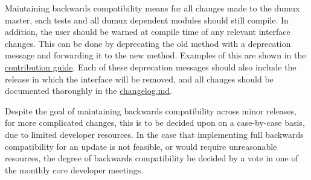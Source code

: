 Maintaining backwards compatibility means for all changes made to the dumux master, each tests and all dumux dependent modules should still compile. In addition, the user should be warned at compile time of any relevant interface changes. This can be done by deprecating the old method with a deprecation message and forwarding it to the new method. Examples of this are shown in the \href{https://git.iws.uni-stuttgart.de/dumux-repositories/dumux/blob/master/CONTRIBUTING.md}{contribution guide}. Each of these deprecation messages should also include the release in which the interface will be removed, and all changes should be documented thoroughly in the \href{https://git.iws.uni-stuttgart.de/dumux-repositories/dumux/-/blob/master/CHANGELOG.md}{changelog.md}.

Despite the goal of maintaining backwards compatibility across minor releases,
for more complicated changes, this is to be decided upon on a case-by-case basis, due to limited developer resources.
In the case that implementing full backwards compatibility for an update is not feasible, or would require unreasonable resources, the degree of backwards compatibility be decided by a vote in one of the monthly core developer meetings.
